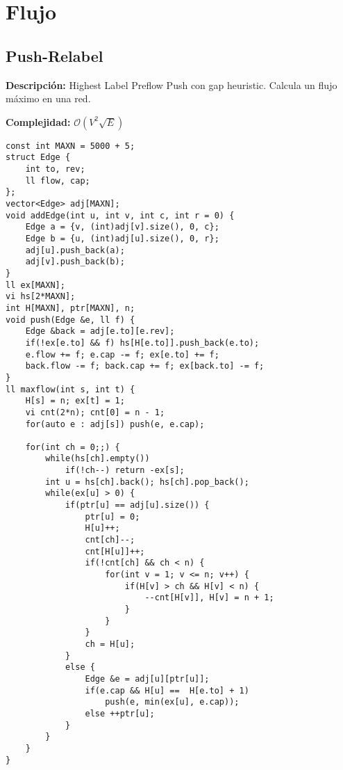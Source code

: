 \documentclass[twocolumn]{article}
\begin{document}
\section{Flujo}
\subsection{Push-Relabel}
\begin{footnotesize}{\bf Descripción: } Highest Label Preflow Push con gap heuristic. Calcula un flujo máximo en una red.


{\bf Complejidad: } $\mathcal{O}(V^2\sqrt{E})$
\end{footnotesize}\lstset{basicstyle=\footnotesize\ttfamily,breaklines=true,tabsize=2,language=C++,frame=leftline, numbers=left, numberstyle=\tiny, numbersep=5pt}
\begin{lstlisting}
const int MAXN = 5000 + 5;
struct Edge {
	int to, rev;
	ll flow, cap;
};
vector<Edge> adj[MAXN];
void addEdge(int u, int v, int c, int r = 0) {
	Edge a = {v, (int)adj[v].size(), 0, c};
	Edge b = {u, (int)adj[u].size(), 0, r};
	adj[u].push_back(a);
	adj[v].push_back(b);
}
ll ex[MAXN];
vi hs[2*MAXN];
int H[MAXN], ptr[MAXN], n;
void push(Edge &e, ll f) {
	Edge &back = adj[e.to][e.rev];
	if(!ex[e.to] && f) hs[H[e.to]].push_back(e.to);
	e.flow += f; e.cap -= f; ex[e.to] += f;
	back.flow -= f; back.cap += f; ex[back.to] -= f;
}
ll maxflow(int s, int t) {
	H[s] = n; ex[t] = 1;
	vi cnt(2*n); cnt[0] = n - 1;
	for(auto e : adj[s]) push(e, e.cap);

	for(int ch = 0;;) {
		while(hs[ch].empty())
			if(!ch--) return -ex[s];
		int u = hs[ch].back(); hs[ch].pop_back();
		while(ex[u] > 0) {
			if(ptr[u] == adj[u].size()) {
				ptr[u] = 0;
				H[u]++;
				cnt[ch]--;
				cnt[H[u]]++;
				if(!cnt[ch] && ch < n) {
					for(int v = 1; v <= n; v++) {
						if(H[v] > ch && H[v] < n) {
							--cnt[H[v]], H[v] = n + 1;
						}
					}
				}
				ch = H[u];
			}
			else {
				Edge &e = adj[u][ptr[u]];
				if(e.cap && H[u] ==  H[e.to] + 1)
					push(e, min(ex[u], e.cap));
				else ++ptr[u];
			}
		}
	}
}
\end{lstlisting}
\end{document}
